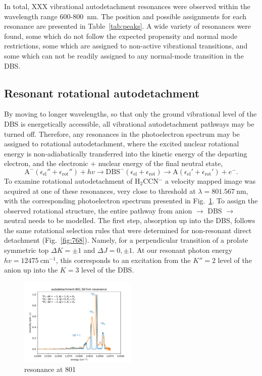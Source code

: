 \documentclass[journal=jpcafh,manuscript=article,layout=onecolumn, 12pt]{achemso}
\begin{document}
In total, XXX vibrational autodetachment resonances were observed within the wavelength range 600-800~nm. The position and possible assignments for each resonance are presented in Table~\ref{tab:peaks}. A wide variety of resonances were found, some which do not follow the expected propensity and normal mode restrictions, some which are assigned to non-active vibrational transitions, and some which can not be readily assigned to any normal-mode transition in the DBS.

\subsection{Resonant rotational autodetachment}
By moving to longer wavelengths, so that only the ground vibrational level of the DBS is energetically accessible, all vibrational autodetachment pathways may be turned off. Therefore, any resonances in the photoelectron spectrum may be assigned to rotational autodetachment, where the excited nuclear rotational energy is non-adiabatically transferred into the kinetic energy of the departing electron, and the electronic + nuclear energy of the final neutral state,
\begin{equation}
	\text{A}^-(\epsilon_{\text{el}}''+\epsilon_{\text{rot}}'') + hv \rightarrow \text{DBS}^-(\epsilon_{\text{el}}+\epsilon_{\text{rot}}) \rightarrow \text{A}(\epsilon_{\text{el}}'+\epsilon_{\text{rot}}') + e^-.
	\label{eq:rot-energy}
\end{equation}
To examine rotational autodetachment of H$_2$CCN$^-$ a velocity mapped image was acquired at one of these resonances, very close to threshold at $\lambda = 801.567~$nm, with the corresponding photoelectron spectrum presented in Fig.~\ref{fig:801}. To assign the observed rotational structure, the entire pathway from anion $\rightarrow$ DBS $\rightarrow$ neutral needs to be modelled. The first step, absorption up into the DBS, follows the same rotational selection rules that were determined for non-resonant direct detachment (Fig.~\ref{fig:768}). Namely, for a perpendicular transition of a prolate symmetric top $\Delta K = \pm 1$ and $\Delta J = 0,\pm1$. At our resonant photon energy $hv = 12475~$cm$^{-1}$, this corresponds to an excitation from the $K''=2$ level of the anion up into the $K=3$ level of the DBS.

\begin{figure}
	\includegraphics[width=0.5\textwidth]{scripts/801}
	\caption{resonance at 801}
	\label{fig:801}
\end{figure}
\end{document}
